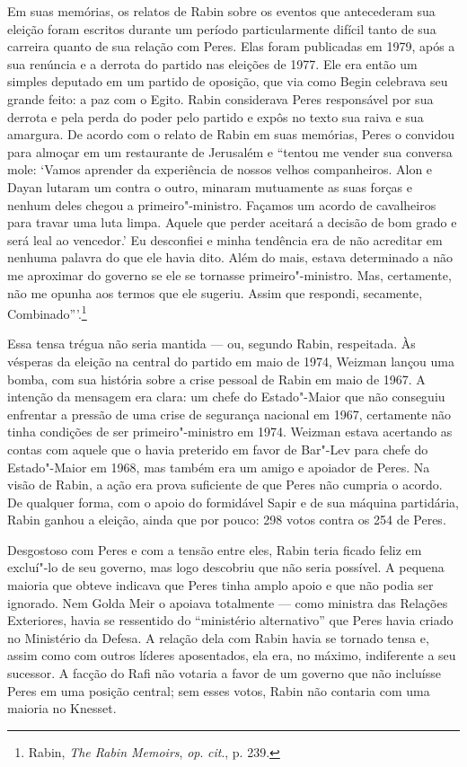 Em suas memórias, os relatos de Rabin sobre os eventos que antecederam
sua eleição foram escritos durante um período particularmente difícil
tanto de sua carreira quanto de sua relação com Peres. Elas foram
publicadas em 1979, após a sua renúncia e a derrota do partido nas
eleições de 1977. Ele era então um simples deputado em um partido de
oposição, que via como Begin celebrava seu grande feito: a paz com o
Egito. Rabin considerava Peres responsável por sua derrota e pela perda
do poder pelo partido e expôs no texto sua raiva e sua amargura. De
acordo com o relato de Rabin em suas memórias, Peres o convidou para
almoçar em um restaurante de Jerusalém e ``tentou me vender sua conversa
mole: `Vamos aprender da experiência de nossos velhos companheiros. Alon
e Dayan lutaram um contra o outro, minaram mutuamente as suas forças e
nenhum deles chegou a primeiro"-ministro. Façamos um acordo de
cavalheiros para travar uma luta limpa. Aquele que perder aceitará a
decisão de bom grado e será leal ao vencedor.' Eu desconfiei e minha
tendência era de não acreditar em nenhuma palavra do que ele havia dito.
Além do mais, estava determinado a não me aproximar do governo se ele se
tornasse primeiro"-ministro. Mas, certamente, não me opunha aos termos
que ele sugeriu. Assim que respondi, secamente, Combinado'''.\footnote{Rabin, \textit{The Rabin Memoirs}, \textit{op}. \textit{cit}., p. 239.}

Essa tensa trégua não seria mantida --- ou, segundo Rabin, respeitada. Às
vésperas da eleição na central do partido em maio de 1974, Weizman
lançou uma bomba, com sua história sobre a crise pessoal de Rabin em maio
de 1967. A intenção da mensagem era clara: um chefe do Estado"-Maior que
não conseguiu enfrentar a pressão de uma crise de segurança nacional em
1967, certamente não tinha condições de ser primeiro"-ministro em 1974.
Weizman estava acertando as contas com aquele que o havia preterido em
favor de Bar"-Lev para chefe do Estado"-Maior em 1968, mas também era um
amigo e apoiador de Peres. Na visão de Rabin, a ação era prova
suficiente de que Peres não cumpria o acordo. De qualquer forma, com o
apoio do formidável Sapir e de sua máquina partidária, Rabin ganhou a
eleição, ainda que por pouco: 298 votos contra os 254 de Peres.

Desgostoso com Peres e com a tensão entre eles, Rabin teria ficado feliz em
excluí"-lo de seu governo, mas logo descobriu que não seria possível. A
pequena maioria que obteve indicava que Peres tinha amplo apoio e que não
podia ser ignorado. Nem Golda Meir o apoiava totalmente ---
como ministra das Relações Exteriores, havia se ressentido do ``ministério
alternativo'' que Peres havia criado no Ministério da Defesa. A relação
dela com Rabin havia se tornado tensa e, assim como com outros líderes
aposentados, ela era, no máximo, indiferente a seu sucessor. A facção do
Rafi não votaria a favor de um governo que não incluísse Peres em uma
posição central; sem esses votos, Rabin não contaria com uma
maioria no Knesset.

